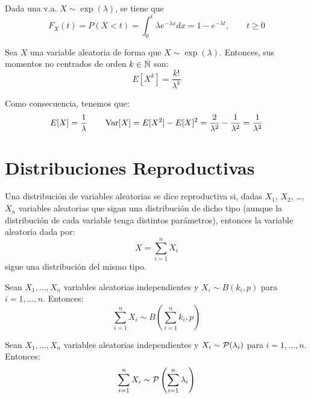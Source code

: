 \begin{observacion}
    Dada una v.a. $X\sim \exp(\lambda)$, se tiene que 
    \begin{equation*}
        F_X(t)=P(X<t)=\int_0^t \lambda e^{-\lambda x} dx = 1-e^{-\lambda t}, \qquad t\geq 0
    \end{equation*}
\end{observacion}

\begin{prop}
    Sea $X$ una variable aleatoria de forma que $X\sim\exp(\lambda)$. Entonces, sus momentos no centrados de orden $k\in \mathbb{N}$ son:
    \begin{equation*}
        E[X^k] = \dfrac{k!}{\lambda^k}
    \end{equation*}
\end{prop}

\noindent
Como consecuencia, tenemos que:
\begin{equation*}
    E[X] = \dfrac{1}{\lambda} \qquad \operatorname{Var}[X] = E[X^2] - E[X]^2 = \dfrac{2}{\lambda^2} - \dfrac{1}{\lambda^2} = \dfrac{1}{\lambda^2}
\end{equation*}

\section{Distribuciones Reproductivas}

\begin{definicion}
    Una distribución de variables aleatorias se dice reproductiva si, dadas $X_1$, $X_2$, \ldots, $X_n$ variables aleatorias que sigan una distribución de dicho tipo (aunque la distribución de cada variable tenga distintos parámetros), entonces la variable aleatoria dada por:
    \begin{equation*}
        X = \sum_{i=1}^{n} X_i
    \end{equation*}
    sigue una distribución del mismo tipo.
\end{definicion}

\begin{prop}
    Sean $X_1, \dots, X_n$ variables aleatorias independientes y $X_i\sim B(k_i, p)$ para $i=1,\dots,n$. Entonces:
    \begin{equation*}
        \sum_{i=1}^{n}X_i \sim B\left(\sum_{i=1}^{n}k_i, p\right)
    \end{equation*}
\end{prop}

\begin{prop}
    Sean $X_1, \dots, X_n$ variables aleatorias independientes y $X_i\sim \mathcal{P}(\lambda_i)$ para $i=1,\dots,n$. Entonces:
    \begin{equation*}
        \sum_{i=1}^{n}X_i \sim \mathcal{P}\left(\sum_{i=1}^{n}\lambda_i\right)
    \end{equation*}
\end{prop}

